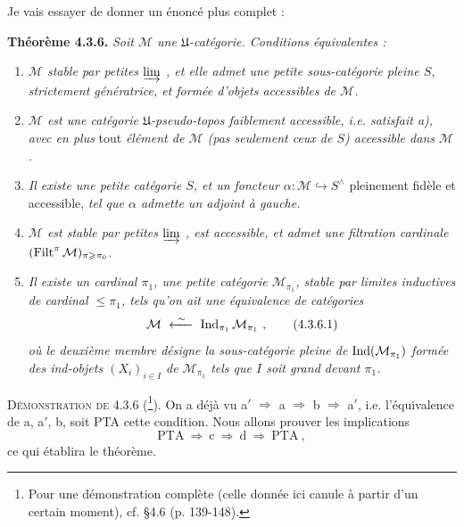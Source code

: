 \noindent Je vais essayer de donner un énoncé plus complet :

\noindent\textbf{Théorème 4.3.6.} \textit{Soit $\mathcal M$ une $\mathfrak U$-catégorie. Conditions équivalentes :}
\begin{enumerate}[label={}]
\item[\textit{a)}] \textit{$\mathcal M$ stable par petites $\varinjlim$ , et elle admet une petite sous-catégorie pleine $S$, strictement génératrice, et formée d'objets accessibles de $\mathcal M$.}
\item[\textit{a$'$)}] \textit{$\mathcal M$ est une catégorie $\mathfrak U$-pseudo-topos faiblement accessible, i.e. satisfait a), avec en plus} tout \textit{élément de $\mathcal M$ (pas seulement ceux de $S$) accessible dans $\mathcal M$.}
\item[\textit{b)}] \textit{Il existe une petite catégorie $S$, et un foncteur $\alpha:\mathcal M\hookrightarrow S^\wedge$} pleinement fidèle et accessible, \textit{tel que $\alpha$ admette un adjoint à gauche.}
\item[\textit{c)}] \textit{$\mathcal M$ est stable par petites $\varinjlim$ , est accessible, et admet une filtration cardinale} $(\operatorname{Filt}^\pi\mathcal M)_{\pi\geqslant\pi_0}$.
\item[\textit{d)}] \textit{Il existe un cardinal $\pi_1$, une petite catégorie $\mathcal M_{\pi_1}$, stable par limites inductives de cardinal $\leqslant\pi_1$, tels qu'on ait une équivalence de catégories}
\[
\mathcal M\ \xleftarrow{\ \sim\ }\ \Ind_{\pi_1}\mathcal M_{\pi_1}\ ,
\tag*{(4.3.6.1)}
\]
\textit{où le deuxième membre désigne la sous-catégorie pleine de} $\operatorname{Ind}(\mathcal M_{\pi_1})$ \textit{formée des ind-objets $(X_i)_{i\in I}$ de $\mathcal M_{\pi_1}$ tels que $I$ soit grand devant $\pi_1$.}
\end{enumerate}

\noindent\textsc{Démonstration de} 4.3.6 (\footnote{Pour une démonstration complète (celle donnée ici canule à partir d'un certain moment), cf. §4.6 (p. 139-148).}). On a déjà vu a$'$ $\Longrightarrow$ a $\Longrightarrow$ b $\Longrightarrow$ a$'$, i.e. l'équivalence de a, a$'$, b, soit PTA cette condition. Nous allons prouver les implications
\[
\mathrm{PTA}\ \Longrightarrow\ \mathrm{c}\ \Longrightarrow\ \mathrm{d}\ \Longrightarrow\ \mathrm{PTA}\ ,
\]
%
ce qui établira le théorème.

